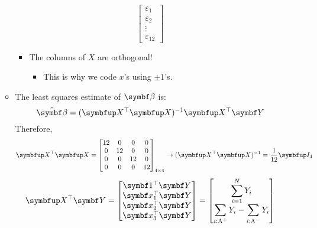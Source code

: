 \begin{itemize}
\begin{itemize}
\[\begin{bmatrix}
                            \varepsilon_1 \\
                            \varepsilon_2 \\
                            \vdots        \\
                            \varepsilon_{12}
                        \end{bmatrix} \]
                    \begin{itemize}[$\star$]
                        \item The columns of $ X $ are orthogonal!
                              \begin{itemize}
                                  \item This is why we code $ x $'s using $ \pm 1 $'s.
                              \end{itemize}
                    \end{itemize}
              \item The least squares estimate of $ \Vector{\beta} $ is:
                    \[ \hat{\RandomVector{\beta}}=(\Matrix{X}^\top\Matrix{X})^{-1}\Matrix{X}^\top \RandomVector{Y} \]
                    Therefore,
                    \[ \Matrix{X}^\top\Matrix{X}=\begin{bmatrix}
                            12 & 0  & 0  & 0  \\
                            0  & 12 & 0  & 0  \\
                            0  & 0  & 12 & 0  \\
                            0  & 0  & 0  & 12
                        \end{bmatrix}_{4\times 4}\rightarrow
                        (\Matrix{X}^\top\Matrix{X})^{-1}=\frac{1}{12}\Matrix{I}_{4} \]
                    \[ \Matrix{X}^\top\RandomVector{Y}=\begin{bmatrix}
                            \Vector{1}^\top \RandomVector{Y}   \\
                            \Vector{x}_1^\top \RandomVector{Y} \\
                            \Vector{x}_2^\top \RandomVector{Y} \\
                            \Vector{x}_3^\top \RandomVector{Y}
                        \end{bmatrix}=\begin{bmatrix}
                            \displaystyle \sum_{i=1}^{N} Y_i                            \\
                            \displaystyle \sum_{i:\text{A}^+}Y_i-\sum_{i:\text{A}^-}Y_i \\

\end{bmatrix}\]
\end{itemize}
\end{itemize}

